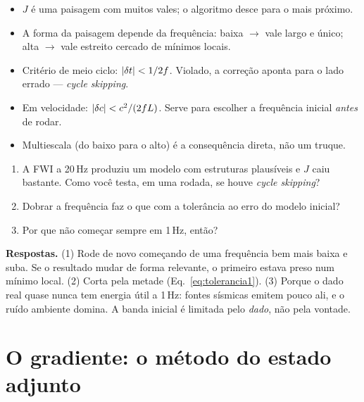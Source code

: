 \documentclass[11pt,a4paper,oneside]{report}
\begin{document}

\begin{resumo}
\begin{itemize}[leftmargin=*, itemsep=1pt]
\item $J$ \'e uma paisagem com muitos vales; o algoritmo desce para o mais
pr\'oximo.
\item A forma da paisagem depende da frequ\^encia: baixa $\to$ vale largo e
\'unico; alta $\to$ vale estreito cercado de m\'inimos locais.
\item Crit\'erio de meio ciclo: $\lvert \delta t \rvert < 1/2f$. Violado, a
corre\c{c}\~ao aponta para o lado errado --- \emph{cycle skipping}.
\item Em velocidade: $\lvert \delta c \rvert < c^{2}/(2fL)$. Serve para escolher a
frequ\^encia inicial \emph{antes} de rodar.
\item Multiescala (do baixo para o alto) \'e a consequ\^encia direta, n\~ao um
truque.
\end{itemize}
\end{resumo}

\begin{exercicio}
\begin{enumerate}[leftmargin=*, itemsep=2pt]
\item A FWI a 20\,Hz produziu um modelo com estruturas plaus\'iveis e $J$ caiu
bastante. Como voc\^e testa, em uma rodada, se houve \emph{cycle skipping}?
\item Dobrar a frequ\^encia faz o que com a toler\^ancia ao erro do modelo
inicial?
\item Por que n\~ao come\c{c}ar sempre em 1\,Hz, ent\~ao?
\end{enumerate}
\textbf{Respostas.} (1) Rode de novo come\c{c}ando de uma frequ\^encia bem
mais baixa e suba. Se o resultado mudar de forma relevante, o primeiro estava
preso num m\'inimo local. (2) Corta pela metade (Eq.~\ref{eq:tolerancia1}).
(3) Porque o dado real quase nunca tem energia \'util a 1\,Hz: fontes
s\'ismicas emitem pouco ali, e o ru\'ido ambiente domina. A banda inicial \'e
limitada pelo \emph{dado}, n\~ao pela vontade.
\end{exercicio}

\chapter{O gradiente: o m\'etodo do estado adjunto}
\label{cap:adjunto}
\end{document}

